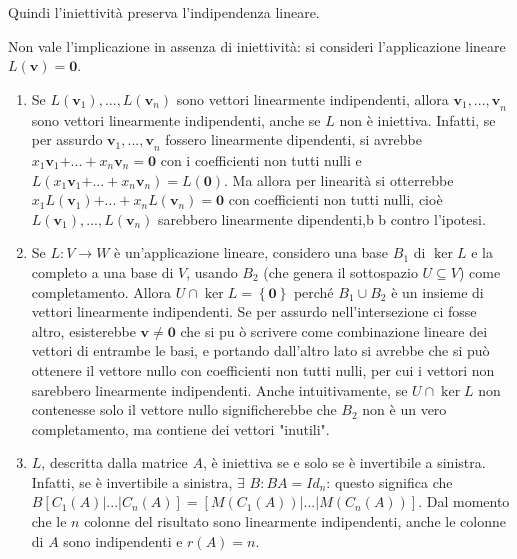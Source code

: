 \documentclass{article}
\begin{document}
Quindi l'iniettivit\`{a} preserva l'indipendenza lineare.

Non vale l'implicazione in assenza di iniettivit\`{a}: si consideri
l'applicazione lineare $L\left( \mathbf{v}\right) =\mathbf{0}$.

\begin{enumerate}
\item Se $L\left( \mathbf{v}_{1}\right) ,...,L\left( \mathbf{v}_{n}\right) $
sono vettori linearmente indipendenti, allora $\mathbf{v}_{1}\mathbf{,...,v}%
_{n}$ sono vettori linearmente indipendenti, anche se $L$ non \`{e}
iniettiva. Infatti, se per assurdo $\mathbf{v}_{1}\mathbf{,...,v}_{n}$
fossero linearmente dipendenti, si avrebbe $x_{1}\mathbf{v}_{1}\mathbf{+...+}%
x_{n}\mathbf{v}_{n}=\mathbf{0}$ con i coefficienti non tutti nulli e $%
L\left( x_{1}\mathbf{v}_{1}\mathbf{+...+}x_{n}\mathbf{v}_{n}\right) =L\left( 
\mathbf{0}\right) $. Ma allora per linearit\`{a} si otterrebbe $x_{1}L\left( 
\mathbf{v}_{1}\right) \mathbf{+...+}x_{n}L\left( \mathbf{v}_{n}\right) =%
\mathbf{0}$ con coefficienti non tutti nulli, cio\`{e} $L\left( \mathbf{v}%
_{1}\right) ,...,L\left( \mathbf{v}_{n}\right) $ sarebbero linearmente
dipendenti,b b contro l'ipotesi.

\item Se $L:V\rightarrow W$ \`{e} un'applicazione lineare, considero una
base $B_{1}$ di $\ker L$ e la completo a una base di $V$, usando $B_{2}$
(che genera il sottospazio $U\subseteq V$) come completamento. Allora $U\cap
\ker L=\left\{ \mathbf{0}\right\} $ perch\'{e} $B_{1}\cup B_{2}$ \`{e} un
insieme di vettori linearmente indipendenti. Se per assurdo
nell'intersezione ci fosse altro, esisterebbe $\mathbf{v\neq 0}$ che si pu%
\`{o} scrivere come combinazione lineare dei vettori di entrambe le basi, e
portando dall'altro lato si avrebbe che si pu\`{o} ottenere il vettore nullo
con coefficienti non tutti nulli, per cui i vettori non sarebbero
linearmente indipendenti. Anche intuitivamente, se $U\cap \ker L$ non
contenesse solo il vettore nullo significherebbe che $B_{2}$ non \`{e} un
vero completamento, ma contiene dei vettori "inutili".

\item $L$, descritta dalla matrice $A$, \`{e} iniettiva se e solo se \`{e}
invertibile a sinistra. Infatti, se \`{e} invertibile a sinistra, $\exists $ 
$B:BA=Id_{n}$: questo significa che $B\left[ C_{1}\left( A\right)
|...|C_{n}\left( A\right) \right] =\left[ M\left( C_{1}\left( A\right)
\right) |...|M\left( C_{n}\left( A\right) \right) \right] $. Dal momento che
le $n$ colonne del risultato sono linearmente indipendenti, anche le colonne
di $A$ sono indipendenti e $r\left( A\right) =n$.
\end{enumerate}
\end{document}
